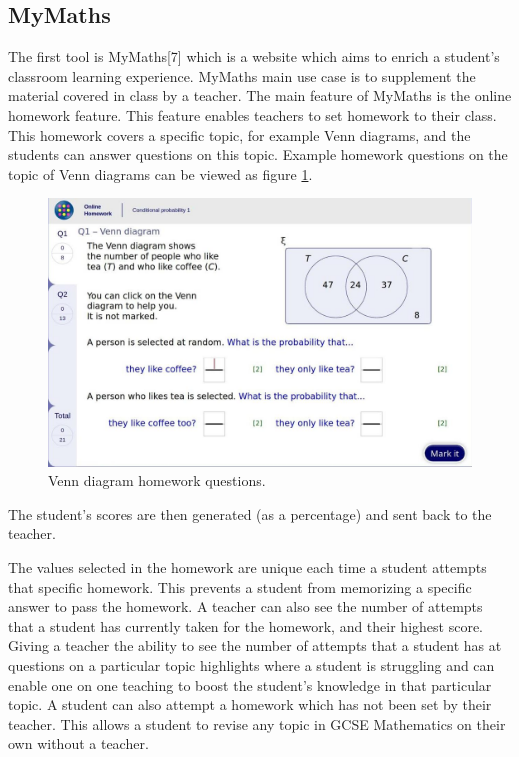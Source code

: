 \documentclass{article}
\begin{document}
\subsection{MyMaths}

The first tool is MyMaths[7] which is a website which aims to enrich a student's classroom learning experience. MyMaths main use case is to supplement the material covered in class by a teacher. The main feature of MyMaths is the online homework feature. This feature enables teachers to set homework to their class. This homework covers a specific topic, for example Venn diagrams, and the students can answer questions on this topic. Example homework questions on the topic of Venn diagrams can be viewed as figure \ref{figure:mymathsHomeworkQuestion1}.
\begin{figure}[H]
	\centering
	\includegraphics[width=0.9\linewidth]{./data/mymathsQuestion1.jpg}
	\caption{Venn diagram homework questions.}
	\label{figure:mymathsHomeworkQuestion1}
\end{figure}
The student's scores are then generated (as a percentage) and sent back to the teacher. \par

The values selected in the homework are unique each time a student attempts that specific homework. This prevents a student from memorizing a specific answer to pass the homework. A teacher can also see the number of attempts that a student has currently taken for the homework, and their highest score. Giving a teacher the ability to see the number of attempts that a student has at questions on a particular topic highlights where a student is struggling and can enable one on one teaching to boost the student's knowledge in that particular topic. A student can also attempt a homework which has not been set by their teacher. This allows a student to revise any topic in GCSE Mathematics on their own without a teacher. \par
\end{document}
